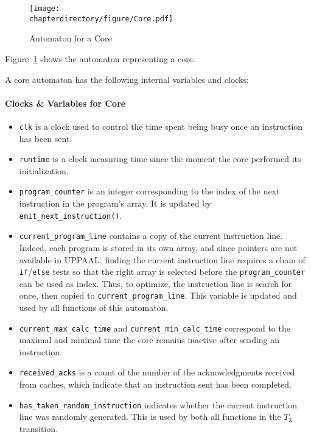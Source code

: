 \begin{figure}[hbt!]
\begin{center}
\texttt{[image: \\chapterdirectory/figure/Core.pdf]}
\end{center}
\caption{Automaton for a Core}
\label{fig:UPPAAL:Core}
\end{figure}
Figure~\ref{fig:UPPAAL:Core} shows the automaton representing a core.

A core automaton has the following internal variables and clocks:
\paragraph{Clocks \& Variables for Core}
\begin{itemize}
\item
   \lstinline!clk! is a clock used to control the time spent being busy once
   an instruction has been sent.
\item
   \lstinline!runtime! is a clock measuring time since the moment the core
   performed its initialization.
\item
   \lstinline!program_counter! is an integer corresponding to the index of the
   next instruction in the program's array. It is updated by
   \lstinline!emit_next_instruction()!.
\item
   \lstinline!current_program_line! contains a copy of the current instruction
   line. Indeed, each program is stored in its own array, and since pointers are
   not available in UPPAAL, finding the current instruction line requires a
   chain of \lstinline!if!/\lstinline!else! tests so that the right array is
   selected before the \lstinline!program_counter! can be used as index. Thus,
   to optimize, the instruction line is search for once, then copied to
   \lstinline!current_program_line!. This variable is updated and used by all
   functions of this automaton.
\item
   \lstinline!current_max_calc_time! and \lstinline!current_min_calc_time!
   correspond to the maximal and minimal time the core remains inactive after
   sending an instruction.
\item
   \lstinline!received_acks! is a count of the number of the acknowledgments
   received from caches, which indicate that an instruction sent has been
   completed.
\item
   \lstinline!has_taken_random_instruction! indicates whether the current
   instruction line was randomly generated. This is used by both all functions
   in the $T_3$ transition.
\end{itemize}


